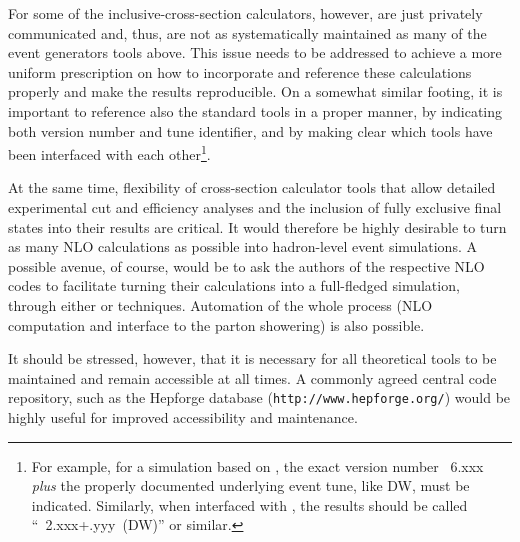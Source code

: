 For some of the inclusive-cross-section calculators, however, are just privately communicated
and, thus, are not as systematically maintained as many of the event generators tools above.  
This issue needs to be addressed to achieve a more uniform prescription on how to incorporate 
and reference these calculations properly and make the results reproducible.
On a somewhat similar footing, it is important to reference also the standard
tools in a proper manner, by indicating both version number and tune identifier,
and by making clear which tools have been interfaced with each other\footnote{
    For example, for a simulation based on \pythiasix, the exact version number
    \pythia~6.xxx {\em plus} the properly documented underlying event tune, 
    like DW, must be indicated.  Similarly, when interfaced with \alpgen,
    the results should be called ``\alpgen~2.xxx+\pythiasix.yyy~(DW)'' or 
    similar.  
}.

At the same time, flexibility of cross-section calculator tools that 
allow detailed experimental cut and efficiency analyses and the
inclusion of fully exclusive final states into their results are critical.  
It would therefore be highly desirable to turn as many NLO calculations as 
possible into hadron-level event simulations.  A possible avenue, of course, 
would be to ask the authors of the respective NLO codes to facilitate turning 
their calculations into a full-fledged simulation, through either \POWHEG{} or
\MCatNLO{} techniques.  Automation of the whole process (NLO computation and 
interface to the parton showering) is also possible.


It should be stressed, however, that it is necessary for all theoretical 
tools to be maintained and remain accessible at all times.   
A commonly agreed central code repository, such as
the Hepforge database ({\tt http://www.hepforge.org/}) would be highly 
useful for improved accessibility and maintenance. 


